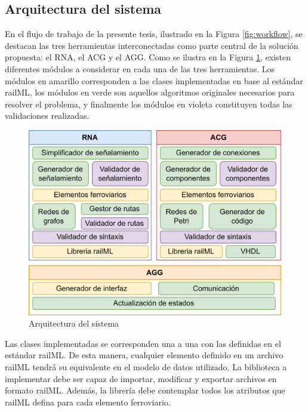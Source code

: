 \subsection{Arquitectura del sistema}

	En el flujo de trabajo de la presente tesis, ilustrado en la Figura \ref{fig:workflow}, se destacan las tres herramientas interconectadas como parte central de la solución propuesta: el RNA, el ACG y el AGG. Como se ilustra en la Figura \ref{fig:architecture}, existen diferentes módulos a considerar en cada una de las tres herramientas. Los módulos en amarillo corresponden a las clases implementadas en base al estándar railML, los módulos en verde son aquellos algoritmos originales necesarios para resolver el problema, y finalmente los módulos en violeta constituyen todas las validaciones realizadas. 

    \begin{figure}[H]
        \centering
        \includegraphics[width=1\textwidth]{Figuras/Architecture.png}
        \centering\caption{Arquitectura del sistema}
        \label{fig:architecture}
    \end{figure}

    Las clases implementadas se corresponden una a una con las definidas en el estándar railML. De esta manera, cualquier elemento definido en un archivo railML tendrá su equivalente en el modelo de datos utilizado. La biblioteca a implementar debe ser capaz de importar, modificar y exportar archivos en formato railML. Además, la librería debe contemplar todos los atributos que railML defina para cada elemento ferroviario.

